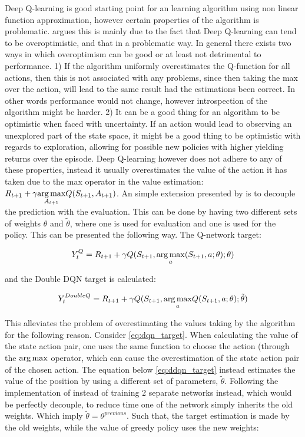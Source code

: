 Deep Q-learning is good starting point for an learning algorithm using non linear function approximation, however certain properties of the algorithm is problematic. \parencite{van_hasselt_deep_2015} argues this is mainly due to the fact that Deep Q-learning can tend to be overoptimistic, and that in a problematic way. In general there exists two ways in which overoptimism can be good or at least not detrimental to performance. 1) If the algorithm uniformly overestimates the Q-function for all actions, then this is not associated with any problems, since then taking the max over the action, will lead to the same result had the estimations been correct. In other words performance would not change, however introspection of the algorithm might be harder. 2) It can be a good thing for an algorithm to be optimistic when faced with uncertainty. If an action would lead to observing an unexplored part of the state space, it might be a good thing to be optimistic with regards to exploration, allowing for possible new policies with higher yielding returns over the episode. Deep Q-learning however does not adhere to any of these properties, instead it usually overestimates the value of the action it has taken due to the max operator in the value estimation: $R_{t+1} + \gamma \underset{A_{t+1}}{\operatorname*{arg\,max}} Q(S_{t+1}, A_{t+1})$. An simple extension presented by \textcite{van_hasselt_deep_2015} is to decouple the prediction with the evaluation. This can be done by having two different sets of weights $\theta$ and $\tilde{\theta}$, where one is used for evaluation and one is used for the policy. This can be presented the following way. The Q-network target:

\begin{equation}\label{eq:dqn_target}
    Y_t^{Q} = R_{t+1} + \gamma Q(S_{t+1}, \underset{a}{\operatorname*{arg\,max}} (S_{t+1}, a ; \theta) ; \theta)
\end{equation}

and the Double DQN target is calculated:

\begin{equation}\label{eq:ddqn_target}
    Y_t^{DoubleQ} = R_{t+1} + \gamma Q(S_{t+1}, \underset{a}{\operatorname*{arg\,max}}Q(S_{t+1}, a; \theta); \tilde{\theta}) 
\end{equation}

This alleviates the problem of overestimating the values taking by the algorithm for the following reason. Consider \eqref{eq:dqn_target}. When calculating the value of the state action pair, one uses the same function to choose the action (through the $\operatorname*{arg\,max}$ operator, which can cause the overestimation of the state action pair of the chosen action. The equation below \eqref{eq:ddqn_target} instead estimates the value of the position by using a different set of parameters, $\tilde{\theta}$. Following the implementation of \textcite{van_hasselt_deep_2015} instead of training 2 separate networks instead, which would be perfectly decouple, to reduce time one of the network simply inherits the old weights. Which imply $\tilde{\theta} = \theta^{previous}$. Such that, the target estimation is made by the old weights, while the value of greedy policy uses the new weights:

